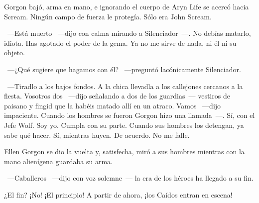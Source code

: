 Gorgon bajó, arma en mano, e ignorando el cuerpo de Aryn Life se acercó hacia Scream. Ningún campo de fuerza le protegía. Sólo era John Scream.

~---Está muerto ~---dijo con calma mirando a Silenciador~---. No debías matarlo, idiota. Has agotado el poder de la gema. Ya no me sirve de nada, ni él ni su objeto.

~---¿Qué sugiere que hagamos con él? ~---preguntó lacónicamente Silenciador.

~---Tiradlo a los bajos fondos. A la chica llevadla a los callejones cercanos a la fiesta. Vosotros dos ~---dijo señalando a dos de los guardias~--- vestiros de paisano y fingid que la habéis matado allí en un atraco. Vamos ~---dijo impaciente. Cuando los hombres se fueron Gorgon hizo una llamada~---. Sí, con el Jefe Wolf. Soy yo. Cumpla con su parte. Cuando sus hombres los detengan, ya sabe qué hacer. Sí, mientras huyen. De acuerdo. No me falle.

Ellen Gorgon se dio la vuelta y, satisfecha, miró a sus hombres mientras con la mano alienígena guardaba su arma.

~---Caballeros ~---dijo con voz solemne~--- la era de los héroes ha llegado a su fin.

\begin{next}
    ¿El fin? ¡No! ¡El principio! A partir de ahora, ¡los Caídos entran en escena!
\end{next}

\endinput
